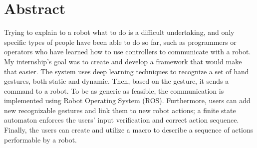 \documentclass[../thesis.tex]{subfiles}
\begin{document}
    \cleardoublepage
    \begingroup
    \let\clearpage\relax
    \let\cleardoublepage\relax

    \chapter*{Abstract}
    Trying to explain to a robot what to do is a difficult undertaking, and only specific types of people have been able to do so far, such as programmers or operators who have learned how to use controllers to communicate with a robot. My internship's goal was to create and develop a framework that would make that easier. The system uses deep learning techniques to recognize a set of hand gestures, both static and dynamic. Then, based on the gesture, it sends a command to a robot. To be as generic as feasible, the communication is implemented using Robot Operating System (ROS). Furthermore, users can add new recognizable gestures and link them to new robot actions; a finite state automaton enforces the users' input verification and correct action sequence. Finally, the users can create and utilize a macro to describe a sequence of actions performable by a robot.

    \endgroup

    \vfill
\end{document}

